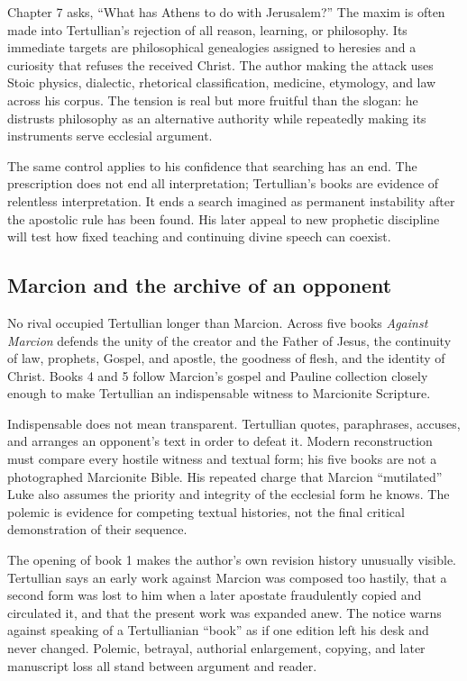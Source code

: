Chapter 7 asks, ``What has Athens to do with Jerusalem?'' The maxim is often
made into Tertullian's rejection of all reason, learning, or philosophy. Its
immediate targets are philosophical genealogies assigned to heresies and a
curiosity that refuses the received Christ. The author making the attack uses
Stoic physics, dialectic, rhetorical classification, medicine, etymology, and
law across his corpus. The tension is real but more fruitful than the slogan:
he distrusts philosophy as an alternative authority while repeatedly making
its instruments serve ecclesial argument.

The same control applies to his confidence that searching has an end. The
prescription does not end all interpretation; Tertullian's books are evidence
of relentless interpretation. It ends a search imagined as permanent
instability after the apostolic rule has been found. His later appeal to new
prophetic discipline will test how fixed teaching and continuing divine speech
can coexist.

\subsection{Marcion and the archive of an opponent}

No rival occupied Tertullian longer than Marcion. Across five books
\emph{Against Marcion} defends the unity of the creator and the Father of
Jesus, the continuity of law, prophets, Gospel, and apostle, the goodness of
flesh, and the identity of Christ. Books 4 and 5 follow Marcion's gospel and
Pauline collection closely enough to make Tertullian an indispensable witness
to Marcionite Scripture.

Indispensable does not mean transparent. Tertullian quotes, paraphrases,
accuses, and arranges an opponent's text in order to defeat it. Modern
reconstruction must compare every hostile witness and textual form; his five
books are not a photographed Marcionite Bible. His repeated charge that Marcion
``mutilated'' Luke also assumes the priority and integrity of the ecclesial
form he knows. The polemic is evidence for competing textual histories, not the
final critical demonstration of their sequence.

The opening of book 1 makes the author's own revision history unusually visible.
Tertullian says an early work against Marcion was composed too hastily, that a
second form was lost to him when a later apostate fraudulently copied and
circulated it, and that the present work was expanded anew. The notice warns
against speaking of a Tertullianian ``book'' as if one edition left his desk and
never changed. Polemic, betrayal, authorial enlargement, copying, and later
manuscript loss all stand between argument and reader.

